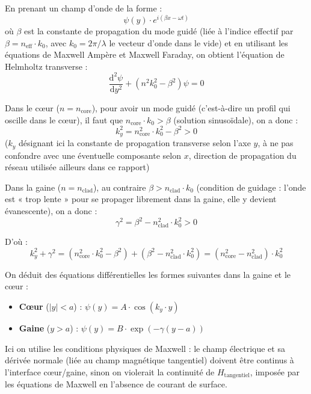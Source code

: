 \documentclass[a4paper,11pt]{report}
\begin{document}
En prenant un champ d'onde de la forme :
\begin{equation}
\psi(y) \cdot e^{i (\beta x - \omega t)}
\end{equation}
où $\beta$ est la constante de propagation du mode guidé (liée à l'indice effectif par $\beta=n_{\text{eff}}\cdot k_0$, avec $k_0=2\pi/\lambda$ le vecteur d'onde dans le vide) et en utilisant les équations de Maxwell Ampère et Maxwell Faraday, on obtient l'équation de Helmholtz transverse :
\begin{equation}
\frac{\text{d}^2\psi}{\text{d}y^2} + (n^2 k_0^2 - \beta^2) \psi = 0
\end{equation}

Dans le cœur ($n = n_{\text{core}}$), pour avoir un mode guidé (c'est-à-dire un profil qui oscille dans le cœur), il faut que $n_{\text{core}} \cdot k_0 > \beta$ (solution sinusoïdale), on a donc :
\begin{equation}
k_y^2 = n_{\text{core}}^2 \cdot k_0^2 - \beta^2 > 0
\end{equation}
($k_y$ désignant ici la constante de propagation transverse selon l'axe $y$, à ne pas confondre avec une éventuelle composante selon $x$, direction de propagation du réseau utilisée ailleurs dans ce rapport)

Dans la gaine ($n = n_{\text{clad}}$), au contraire $\beta > n_{\text{clad}} \cdot k_0$ (condition de guidage : l'onde est « trop lente » pour se propager librement dans la gaine, elle y devient évanescente), on a donc :
\begin{equation}
\gamma^2 = \beta^2 - n_{\text{clad}}^2 \cdot k_0^2 > 0
\end{equation}

D'où :
\begin{equation}
k_y^2 + \gamma^2 = (n_{\text{core}}^2 \cdot k_0^2 - \beta^2) + (\beta^2 - n_{\text{clad}}^2 \cdot k_0^2) = (n_{\text{core}}^2 - n_{\text{clad}}^2) \cdot k_0^2
\end{equation}

On déduit des équations différentielles les formes suivantes dans la gaine et le cœur :
\begin{itemize}
    \item \textbf{Cœur} ($|y| < a$) : $\psi(y) = A \cdot \cos(k_y \cdot y)$
    \item \textbf{Gaine} ($y > a$) : $\psi(y) = B \cdot \exp(-\gamma (y-a))$
\end{itemize}

Ici on utilise les conditions physiques de Maxwell : le champ électrique et sa dérivée normale (liée au champ magnétique tangentiel) doivent être continus à l'interface cœur/gaine, sinon on violerait la continuité de $H_{\text{tangentiel}}$, imposée par les équations de Maxwell en l'absence de courant de surface.
\end{document}
